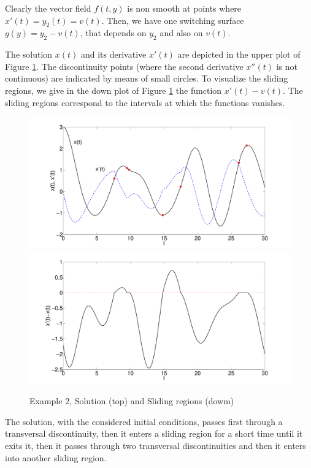 \documentclass{article}
\begin{document}
\begin{description}
\medskip

Clearly the vector field $f(t,y)$ is non smooth at points where $x'(t)=y_2(t)=v(t)$.
Then, we have one switching surface  $g(y)=y_2-v(t)$, that depends on $y_2$
and also on $v(t)$.

The solution $x(t)$ and its derivative $x'(t)$  are depicted in the  upper plot of Figure \ref{Example2}.  The discontinuity points (where the second derivative $x''(t)$ is not continuous) are indicated by means of small circles.
To visualize the sliding regions, we give in the down plot of Figure \ref{Example2} the function $x'(t)-v(t)$.
The sliding regions correspond to the intervals at which the functions vanishes.

\begin{figure}[!h]
\includegraphics[width=12 true cm]{Example2} \\
\includegraphics[width=12 true cm]{Example2-sliding}
\caption{Example 2, Solution (top) and  Sliding regions (dowm)}
\label{Example2}
\end{figure}

The solution, with the considered initial conditions,
passes first through a transversal discontinuity, then  it enters a sliding
region for a short time until it exits it, then it passes through two transversal discontinuities and then
it enters into another sliding region.


\end{description}
\end{document}
